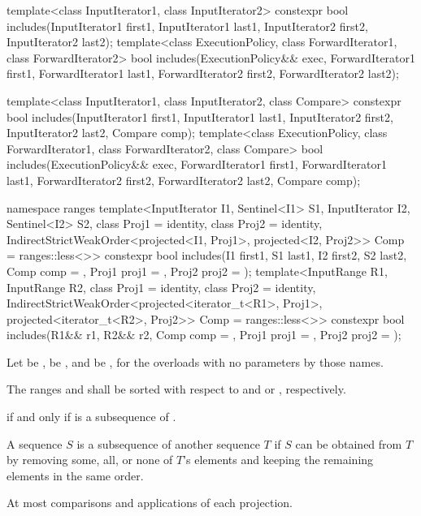 %
\begin{itemdecl}
template<class InputIterator1, class InputIterator2>
  constexpr bool includes(InputIterator1 first1, InputIterator1 last1,
                          InputIterator2 first2, InputIterator2 last2);
template<class ExecutionPolicy, class ForwardIterator1, class ForwardIterator2>
  bool includes(ExecutionPolicy&& exec,
                ForwardIterator1 first1, ForwardIterator1 last1,
                ForwardIterator2 first2, ForwardIterator2 last2);

template<class InputIterator1, class InputIterator2, class Compare>
  constexpr bool includes(InputIterator1 first1, InputIterator1 last1,
                          InputIterator2 first2, InputIterator2 last2,
                          Compare comp);
template<class ExecutionPolicy, class ForwardIterator1, class ForwardIterator2, class Compare>
  bool includes(ExecutionPolicy&& exec,
                ForwardIterator1 first1, ForwardIterator1 last1,
                ForwardIterator2 first2, ForwardIterator2 last2,
                Compare comp);

namespace ranges {
  template<InputIterator I1, Sentinel<I1> S1, InputIterator I2, Sentinel<I2> S2,
           class Proj1 = identity, class Proj2 = identity,
           IndirectStrictWeakOrder<projected<I1, Proj1>,
                                   projected<I2, Proj2>> Comp = ranges::less<>>
    constexpr bool includes(I1 first1, S1 last1, I2 first2, S2 last2, Comp comp = {},
                            Proj1 proj1 = {}, Proj2 proj2 = {});
  template<InputRange R1, InputRange R2, class Proj1 = identity,
           class Proj2 = identity,
           IndirectStrictWeakOrder<projected<iterator_t<R1>, Proj1>,
                                   projected<iterator_t<R2>, Proj2>> Comp = ranges::less<>>
    constexpr bool includes(R1&& r1, R2&& r2, Comp comp = {},
                            Proj1 proj1 = {}, Proj2 proj2 = {});
}
\end{itemdecl}

\begin{itemdescr}
\pnum
Let  be ,
 be , and
 be ,
for the overloads with no parameters by those names.

\pnum
\requires
The ranges  and  shall be sorted
with respect to  and  or , respectively.

\pnum
\returns
{}
if and only if  is a subsequence of .
\begin{note}
A sequence $S$ is a subsequence of another sequence $T$ if $S$ can be obtained
from $T$ by removing some, all, or none of $T$'s elements and keeping the
remaining elements in the same order.
\end{note}

\pnum
\complexity
At most 
comparisons and applications of each projection.
\end{itemdescr}


